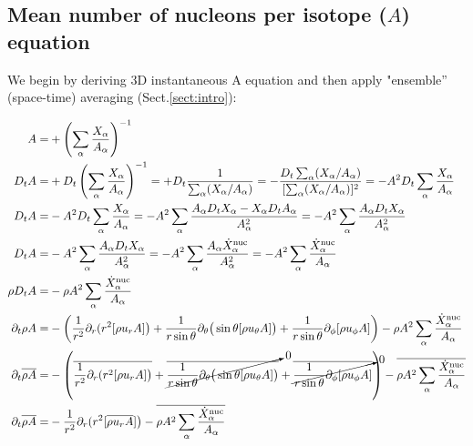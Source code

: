 \documentclass[10pt,paper=a4]{report}
\newcommand{\eht}{\overline}
\begin{document}
\newpage

\subsection{Mean number of nucleons per isotope ($A$) equation} 

We begin by deriving 3D instantaneous A equation and then apply "ensemble'' (space-time) averaging (Sect.\ref{sect:intro}):

\fontsize{9pt}{20pt}

\begin{align}
A = & +\left(\sum_\alpha \frac{X_\alpha}{A_\alpha}  \right)^{-1} \\
D_t A = & +D_t \left(\sum_\alpha \frac{X_\alpha}{A_\alpha}  \right)^{-1} = +D_t \frac{1}{\sum_\alpha (X_\alpha / A_\alpha)} = -\frac{D_t \sum_\alpha (X_\alpha/A_\alpha)}{[\sum_\alpha (X_\alpha/A_\alpha)]^2} = -A^2 D_t \sum_\alpha \frac{X_\alpha}{A_\alpha} \\
D_t A = & -A^2 D_t \sum_\alpha \frac{X_\alpha}{A_\alpha} = -A^2 \sum_\alpha \frac{A_\alpha D_t X_\alpha - X_\alpha D_t A_\alpha}{A^2_\alpha} = -A^2 \sum_\alpha \frac{A_\alpha D_t X_\alpha}{A^2_\alpha} \\
D_t A = & -A^2 \sum_\alpha \frac{A_\alpha D_t X_\alpha}{A^2_\alpha} = -A^2 \sum_\alpha \frac{A_\alpha \dot{X}_\alpha^{\rm nuc}}{A^2_\alpha} = -A^2 \sum_\alpha \frac{\dot{X}_\alpha^{\rm nuc}}{A_\alpha} \\
\rho D_t A = & -\rho A^2 \sum_\alpha \frac{\dot{X}_\alpha^{\rm nuc}}{A_\alpha} \\
\partial_t \rho A = & -\left( \frac{1}{r^{2}} \partial_{r}(r^{2} [\rho u_{r} A ] \big) + \frac{1}{r\sin{\theta}}\partial_{\theta}\big(\sin{\theta} [\rho u_{\theta} A ]\big) + \frac{1}{r \sin{\theta}} \partial_{\phi} [\rho u_{\phi} A] \right) -\rho A^2 \sum_\alpha \frac{\dot{X}_\alpha^{\rm nuc}}{A_\alpha} \\
\partial_t \overline{\rho A} = & -\left( \eht{\frac{1}{r^{2}} \partial_{r}(r^{2} [\rho u_{r} A ] \big)} + \cancelto{0}{\eht{\frac{1}{r\sin{\theta}}\partial_{\theta}\big(\sin{\theta} [\rho u_{\theta} A ]\big)}} + \cancelto{0}{\eht{\frac{1}{r \sin{\theta}} \partial_{\phi} [\rho u_{\phi} A]}} \right) - \eht{\rho A^2 \sum_\alpha \frac{\dot{X}_\alpha^{\rm nuc}}{A_\alpha}} \\
\partial_t \overline{\rho A} = & -\frac{1}{r^{2}} \partial_{r}(r^{2} [\eht{\rho u_{r} A }] \big) - \eht{\rho A^2 \sum_\alpha \frac{\dot{X}_\alpha^{\rm nuc}}{A_\alpha}} \\

\end{align}
\end{document}
